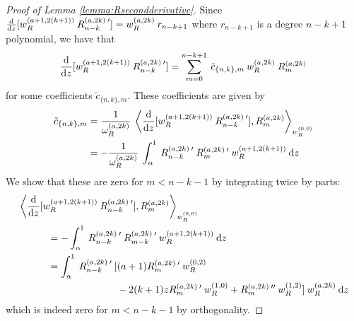 \documentclass[11pt, oneside]{article}   	%
\begin{document}
\begin{proof}[Proof of Lemma \ref{lemma:Rsecondderivative}]
	Since ${{\rm d} \over {\rm d} z}[w_R^{(a+1, 2(k+1))} \: R_{n-k}^{(a,2k) \: \prime}] = w_R^{(a, 2k)} \: r_{n-k+1}$ where $r_{n-k+1}$ is a degree $n - k + 1$ polynomial, we have that 
\begin{align*}
	{{\rm d} \over {\rm d} z}[w_R^{(a+1, 2(k+1))} \: R_{n-k}^{(a,2k) \: \prime}] =\sum_{m=0}^{n-k+1} \: \tilde c_{\{n,k\},m} \: w_R^{(a, 2k)} \: R_{m}^{(a,2k)}
\end{align*}
for some coefficients $\tilde c_{\{n,k\},m}$. These coefficients are given by
\begin{align*}
	\tilde c_{\{n,k\},m} &= \frac{1}{\normgenjac^{(a,2k)}} \: \ip<\ddx{z}[\genjacw^{(a+1, 2(k+1))} \: \genjacnmk^{(a,2k) \: \prime}], \genjac_{m}^{(a,2k)}>_{\genjacw^{(0,0)}} \\
	&= - \frac{1}{\normgenjac^{(a,2k)}}  \: \int_\alpha^1 \: \genjacnmk^{(a,2k) \: \prime} \: \genjac_{m}^{(a,2k) \: \prime} \: \genjacw^{(a+1, 2(k+1))} \: \D z
\end{align*}
We show that these are zero for $m < n - k - 1$ by integrating twice by parts:
\begin{align*}
	&\ip<\ddx{z}[\genjacw^{(a+1, 2(k+1))} \: \genjacnmk^{(a,2k) \: \prime}], \genjac_{m}^{(a,2k)}>_{\genjacw^{(0,0)}} \\
	&\quad \quad \quad = - \int_\alpha^1 \: \genjacnmk^{(a,2k) \: \prime} \: \genjac_{m-k}^{(a,2k) \: \prime} \: \genjacw^{(a+1, 2(k+1))} \: \D z \\
	&\quad \quad \quad = \int_\alpha^1 \: \genjacnmk^{(a,2k) \: \prime} \: [(a+1) \genjac_{m}^{(a,2k) \: \prime} \: \genjacw^{(0, 2)} \\
	&\quad \quad \quad \quad \quad \quad \quad \quad \quad \quad - 2(k+1) z \genjac_{m}^{(a,2k) \: \prime} \: \genjacw^{(1, 0)} + \genjac_{m}^{(a,2k) \: \prime \prime} \: \genjacw^{(1, 2)}] \: \genjacw^{(a, 2k)} \: \D z
\end{align*}
which is indeed zero for $m < n - k - 1$ by orthogonality.
\end{proof}
\end{document}
